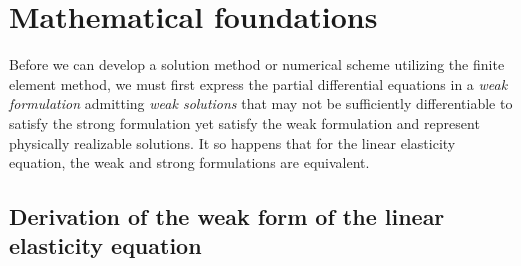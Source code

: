 \documentclass[11pt]{article}
\begin{document}
\section{Mathematical foundations}
Before we can develop a solution method or numerical scheme utilizing the finite element method, we must first express the partial differential equations in a \emph{weak formulation} admitting \emph{weak solutions} that may not be sufficiently differentiable to satisfy the strong formulation yet satisfy the weak formulation and represent physically realizable solutions. It so happens that for the linear elasticity equation, the weak and strong formulations are equivalent.

\subsection{Derivation of the weak form of the linear elasticity equation}
\end{document}
